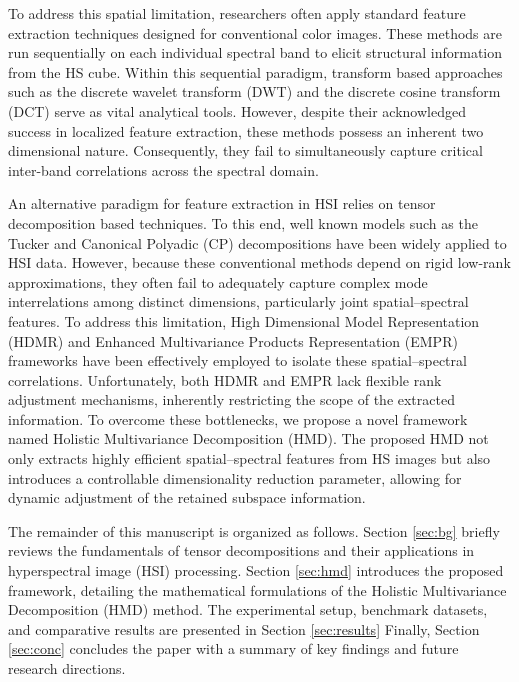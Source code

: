\documentclass[12pt,onecolumn]{article}
\begin{document}
To address this spatial limitation, researchers often apply standard feature extraction techniques designed for conventional color images. These methods are run sequentially on each individual spectral band to elicit structural information from the HS cube. Within this sequential paradigm, transform based approaches such as the discrete wavelet transform (DWT) \cite{tuna_wavelet_hdmr} and the discrete cosine transform (DCT) \cite{dct} serve as vital analytical tools. However, despite their acknowledged success in localized feature extraction, these methods possess an inherent two dimensional nature. Consequently, they fail to simultaneously capture critical inter-band correlations across the spectral domain.

An alternative paradigm for feature extraction in HSI relies on tensor decomposition based techniques. To this end, well known models such as the Tucker \cite{tucker_hsi,kolda,sidiropoulos} and Canonical Polyadic (CP) \cite{cp_hsi,kolda,sidiropoulos} decompositions have been widely applied to HSI data. However, because these conventional methods depend on rigid low-rank approximations, they often fail to adequately capture complex mode interrelations among distinct dimensions, particularly joint spatial–spectral features. To address this limitation, High Dimensional Model Representation (HDMR) \cite{tuna_wavelet_hdmr,tuna_sparse_hdmr,efe_fusion} and Enhanced Multivariance Products Representation (EMPR) \cite{tuna_tgrs,enis} frameworks have been effectively employed to isolate these spatial–spectral correlations. Unfortunately, both HDMR and EMPR lack flexible rank adjustment mechanisms, inherently restricting the scope of the extracted information. To overcome these bottlenecks, we propose a novel framework named Holistic Multivariance Decomposition (HMD). The proposed HMD not only extracts highly efficient spatial–spectral features from HS images but also introduces a controllable dimensionality reduction parameter, allowing for dynamic adjustment of the retained subspace information.

The remainder of this manuscript is organized as follows. Section \ref{sec:bg} briefly reviews the fundamentals of tensor decompositions and their applications in hyperspectral image (HSI) processing. Section \ref{sec:hmd} introduces the proposed framework, detailing the mathematical formulations of the Holistic Multivariance Decomposition (HMD) method. The experimental setup, benchmark datasets, and comparative results are presented in Section \ref{sec:results} Finally, Section \ref{sec:conc} concludes the paper with a summary of key findings and future research directions.
\end{document}
